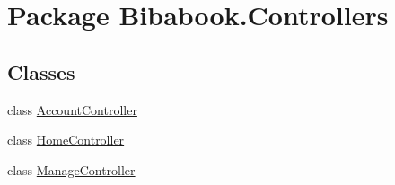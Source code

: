 \hypertarget{namespace_bibabook_1_1_controllers}{}\section{Package Bibabook.\+Controllers}
\label{namespace_bibabook_1_1_controllers}
\subsection*{Classes}
\begin{DoxyCompactItemize}
\item 
class \hyperlink{class_bibabook_1_1_controllers_1_1_account_controller}{Account\+Controller}
\item 
class \hyperlink{class_bibabook_1_1_controllers_1_1_home_controller}{Home\+Controller}
\item 
class \hyperlink{class_bibabook_1_1_controllers_1_1_manage_controller}{Manage\+Controller}
\end{DoxyCompactItemize}
